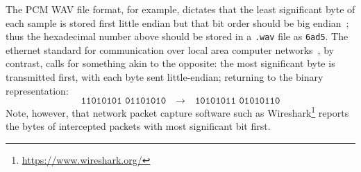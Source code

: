 The PCM WAV file format, for example, dictates that the least significant byte
of each sample is stored first \textemdash{} little endian \textemdash{} but
that bit order should be big endian~\citep{noauthor_multimedia_1991};
thus the hexadecimal number above should be stored in a \texttt{.wav} file as
\texttt{6ad5}.
The ethernet standard for communication over local area computer
networks~\citep{noauthor_ieee_2018}, by contrast, calls for something akin to
the opposite:
the most significant byte is transmitted first, with each byte sent
little-endian;
returning to the binary representation:
\begin{equation*}
    \texttt{11010101 01101010} \quad\rightarrow\quad \texttt{10101011 01010110}
\end{equation*}
Note, however, that network packet capture software such as
Wireshark\footnote{\url{https://www.wireshark.org/}} reports the bytes of
intercepted packets with most significant bit first.
